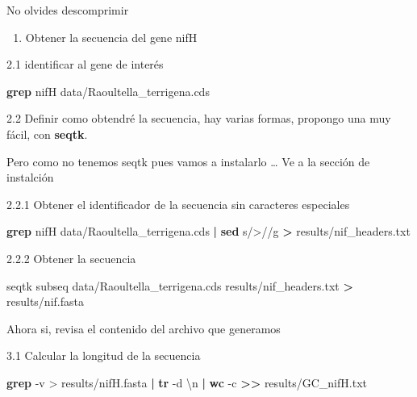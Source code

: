 \documentclass[
]{book}
\newenvironment{Shaded}{\begin{snugshade}}{\end{snugshade}}
\newcommand{\AttributeTok}[1]{\textcolor[rgb]{0.13,0.29,0.53}{#1}}
\newcommand{\ExtensionTok}[1]{#1}
\newcommand{\FunctionTok}[1]{\textcolor[rgb]{0.13,0.29,0.53}{\textbf{#1}}}
\newcommand{\KeywordTok}[1]{\textcolor[rgb]{0.13,0.29,0.53}{\textbf{#1}}}
\newcommand{\NormalTok}[1]{#1}
\newcommand{\OperatorTok}[1]{\textcolor[rgb]{0.81,0.36,0.00}{\textbf{#1}}}
\newcommand{\StringTok}[1]{\textcolor[rgb]{0.31,0.60,0.02}{#1}}
\providecommand{\tightlist}{%
  \setlength{\itemsep}{0pt}\setlength{\parskip}{0pt}}
\begin{document}
No olvides descomprimir

\begin{enumerate}
\def\labelenumi{\arabic{enumi}.}
\setcounter{enumi}{1}
\tightlist
\item
  Obtener la secuencia del gene nifH
\end{enumerate}

2.1 identificar al gene de interés

\begin{Shaded}
\begin{Highlighting}[]
\FunctionTok{grep}\NormalTok{ nifH data/Raoultella\_terrigena.cds }
\end{Highlighting}
\end{Shaded}

2.2 Definir como obtendré la secuencia, hay varias formas, propongo una muy fácil, con \textbf{seqtk}.

Pero como no tenemos seqtk pues vamos a instalarlo \ldots{} Ve a la sección de instalción

2.2.1 Obtener el identificador de la secuencia sin caracteres especiales

\begin{Shaded}
\begin{Highlighting}[]
\FunctionTok{grep}\NormalTok{ nifH data/Raoultella\_terrigena.cds }\KeywordTok{|} \FunctionTok{sed} \StringTok{\textquotesingle{}s/\textgreater{}//g\textquotesingle{}} \OperatorTok{\textgreater{}}\NormalTok{ results/nif\_headers.txt}
\end{Highlighting}
\end{Shaded}

2.2.2 Obtener la secuencia

\begin{Shaded}
\begin{Highlighting}[]
\ExtensionTok{seqtk}\NormalTok{ subseq data/Raoultella\_terrigena.cds results/nif\_headers.txt }\OperatorTok{\textgreater{}}\NormalTok{ results/nif.fasta}
\end{Highlighting}
\end{Shaded}

Ahora si, revisa el contenido del archivo que generamos

3.1 Calcular la longitud de la secuencia

\begin{Shaded}
\begin{Highlighting}[]
\FunctionTok{grep} \AttributeTok{{-}v} \StringTok{\textquotesingle{}\textgreater{}\textquotesingle{}}\NormalTok{ results/nifH.fasta }\KeywordTok{|} \FunctionTok{tr} \AttributeTok{{-}d} \StringTok{\textquotesingle{}\textbackslash{}n\textquotesingle{}} \KeywordTok{|} \FunctionTok{wc} \AttributeTok{{-}c} \OperatorTok{\textgreater{}\textgreater{}}\NormalTok{ results/GC\_nifH.txt}
\end{Highlighting}
\end{Shaded}
\end{document}
